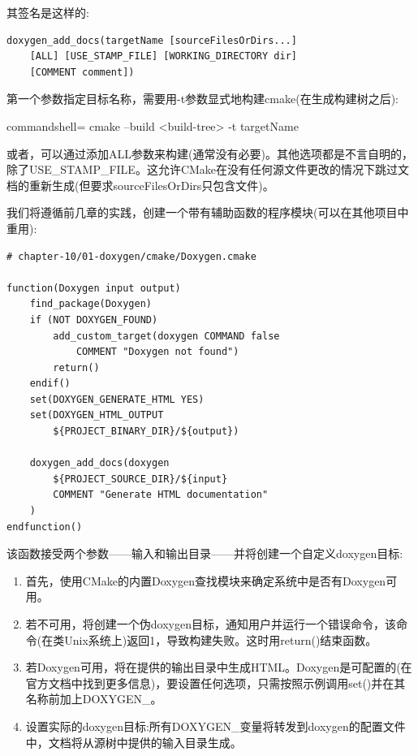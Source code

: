 其签名是这样的:

\begin{lstlisting}[style=styleCMake]
doxygen_add_docs(targetName [sourceFilesOrDirs...]
	[ALL] [USE_STAMP_FILE] [WORKING_DIRECTORY dir]
	[COMMENT comment])
\end{lstlisting}

第一个参数指定目标名称，需要用-t参数显式地构建cmake(在生成构建树之后):

\begin{tcblisting}{commandshell={}}
cmake --build <build-tree> -t targetName
\end{tcblisting}

或者，可以通过添加ALL参数来构建(通常没有必要)。其他选项都是不言自明的，除了USE\_STAMP\_FILE。这允许CMake在没有任何源文件更改的情况下跳过文档的重新生成(但要求sourceFilesOrDirs只包含文件)。

我们将遵循前几章的实践，创建一个带有辅助函数的程序模块(可以在其他项目中重用):

\begin{lstlisting}[style=styleCMake]
# chapter-10/01-doxygen/cmake/Doxygen.cmake

function(Doxygen input output)
	find_package(Doxygen)
	if (NOT DOXYGEN_FOUND)
		add_custom_target(doxygen COMMAND false
			COMMENT "Doxygen not found")
		return()
	endif()
	set(DOXYGEN_GENERATE_HTML YES)
	set(DOXYGEN_HTML_OUTPUT
		${PROJECT_BINARY_DIR}/${output})
		
	doxygen_add_docs(doxygen
		${PROJECT_SOURCE_DIR}/${input}
		COMMENT "Generate HTML documentation"
	)
endfunction()
\end{lstlisting}

该函数接受两个参数——输入和输出目录——并将创建一个自定义doxygen目标:

\begin{enumerate}
\item 
首先，使用CMake的内置Doxygen查找模块来确定系统中是否有Doxygen可用。

\item 
若不可用，将创建一个伪doxygen目标，通知用户并运行一个错误命令，该命令(在类Unix系统上)返回1，导致构建失败。这时用return()结束函数。

\item 
若Doxygen可用，将在提供的输出目录中生成HTML。Doxygen是可配置的(在官方文档中找到更多信息)，要设置任何选项，只需按照示例调用set()并在其名称前加上DOXYGEN\_。

\item 
设置实际的doxygen目标:所有DOXYGEN\_变量将转发到doxygen的配置文件中，文档将从源树中提供的输入目录生成。
\end{enumerate}

